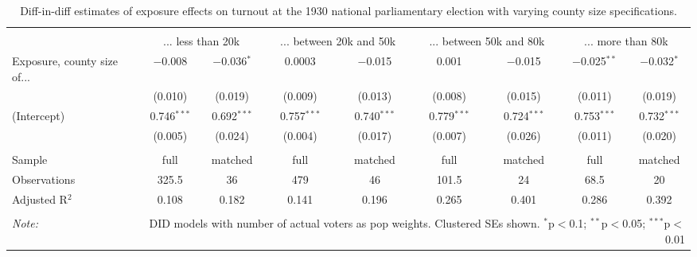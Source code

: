 
\begin{table}[!htbp] \centering 
  \caption{Diff-in-diff estimates of exposure effects on turnout at the 1930 national parliamentary election with varying county size specifications.\vspace{-.25cm}} 
  \label{tab:nsdap-turnout-countysize-dd-1930} 
\scriptsize 
\begin{tabular}{@{\extracolsep{5pt}}lcccccccc} 
\\[-1.8ex]\hline 
\hline \\[-1.8ex] 
 & \multicolumn{2}{c}{... less than 20k } & \multicolumn{2}{c}{... between 20k and 50k} & \multicolumn{2}{c}{... between 50k and 80k} & \multicolumn{2}{c}{... more than 80k} \\ 
 \cmidrule(r){2-3}\cmidrule(r){4-5}\cmidrule(r){6-7}\cmidrule(r){8-9}Exposure, county size of... & $-$0.008 & $-$0.036$^{*}$ & 0.0003 & $-$0.015 & 0.001 & $-$0.015 & $-$0.025$^{**}$ & $-$0.032$^{*}$ \\ 
  & (0.010) & (0.019) & (0.009) & (0.013) & (0.008) & (0.015) & (0.011) & (0.019) \\ 
  (Intercept) & 0.746$^{***}$ & 0.692$^{***}$ & 0.757$^{***}$ & 0.740$^{***}$ & 0.779$^{***}$ & 0.724$^{***}$ & 0.753$^{***}$ & 0.732$^{***}$ \\ 
  & (0.005) & (0.024) & (0.004) & (0.017) & (0.007) & (0.026) & (0.011) & (0.020) \\ 
 \hline \\[-1.8ex] 
Sample & full & matched & full & matched & full & matched & full & matched \\ 
Observations & 325.5 & 36 & 479 & 46 & 101.5 & 24 & 68.5 & 20 \\ 
Adjusted R$^{2}$ & 0.108 & 0.182 & 0.141 & 0.196 & 0.265 & 0.401 & 0.286 & 0.392 \\ 
\hline 
\hline \\[-1.8ex] 
\textit{Note:}  & \multicolumn{8}{r}{DID models with number of actual voters as pop weights. Clustered SEs shown. $^{*}$p$<$0.1; $^{**}$p$<$0.05; $^{***}$p$<$0.01} \\ 
\end{tabular} 
\end{table} 
